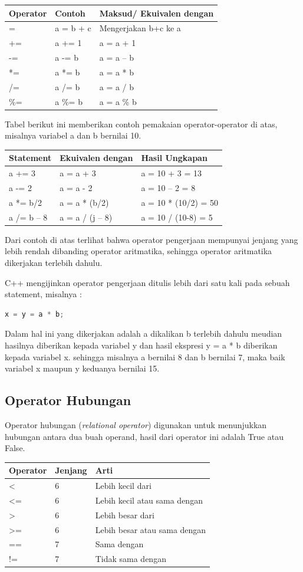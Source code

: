 \begin{longtable}[]{@{}lll@{}}
\toprule
Operator & Contoh & Maksud/ Ekuivalen dengan\tabularnewline
\midrule
\endhead
= & a = b + c & Mengerjakan b+c ke a\tabularnewline
+= & a += 1 & a = a + 1\tabularnewline
-= & a -= b & a = a -- b\tabularnewline
*= & a *= b & a = a * b\tabularnewline
/= & a /= b & a = a / b\tabularnewline
\%= & a \%= b & a = a \% b\tabularnewline
\bottomrule
\end{longtable}

Tabel berikut ini memberikan contoh pemakaian operator-operator di atas,
misalnya variabel a dan b bernilai 10.

\begin{longtable}[]{@{}lll@{}}
\toprule
Statement & Ekuivalen dengan & Hasil Ungkapan\tabularnewline
\midrule
\endhead
a += 3 & a = a + 3 & a = 10 + 3 = 13\tabularnewline
a -= 2 & a = a - 2 & a = 10 -- 2 = 8\tabularnewline
a *= b/2 & a = a * (b/2) & a = 10 * (10/2) = 50\tabularnewline
a /= b -- 8 & a = a / (j -- 8) & a = 10 / (10-8) = 5\tabularnewline
\bottomrule
\end{longtable}

Dari contoh di atas terlihat bahwa operator pengerjaan mempunyai jenjang
yang lebih rendah dibanding operator aritmatika, sehingga operator
aritmatika dikerjakan terlebih dahulu.

C++ mengijinkan operator pengerjaan ditulis lebih dari satu kali pada
sebuah statement, misalnya :

\begin{lstlisting}[language=c++, numbers=none]
x = y = a * b;
\end{lstlisting}

Dalam hal ini yang dikerjakan adalah a dikalikan b terlebih dahulu
meudian hasilnya diberikan kepada variabel y dan hasil ekspresi y = a *
b diberikan kepada variabel x. sehingga misalnya a bernilai 8 dan b
bernilai 7, maka baik variabel x maupun y keduanya bernilai 15.

\subsection{Operator Hubungan}\label{e-operator-hubungan}

Operator hubungan (\emph{relational operator}) digunakan untuk
menunjukkan hubungan antara dua buah operand, hasil dari operator ini
adalah True atau False.

\begin{longtable}[]{@{}lll@{}}
\toprule
Operator & Jenjang & Arti\tabularnewline
\midrule
\endhead
\textless{} & 6 & Lebih kecil dari\tabularnewline
\textless{}= & 6 & Lebih kecil atau sama dengan\tabularnewline
\textgreater{} & 6 & Lebih besar dari\tabularnewline
\textgreater{}= & 6 & Lebih besar atau sama dengan\tabularnewline
== & 7 & Sama dengan\tabularnewline
!= & 7 & Tidak sama dengan\tabularnewline
\bottomrule
\end{longtable}

